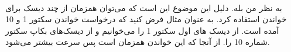 \\\noindent
به نظر من بله. دلیل این موضوع این است که می‌توان همزمان از چند دیسک برای خواندن استفاده کرد.
به عنوان مثال فرض کنید که درخواست خواندن سکتور 1 و 10 آمده است. از دیسک های اول سکتور 1 را می‌خوانیم و
از دیسک‌های بکاپ سکتور شماره 10 را.
از آنجا که این خواندن همزمان است پس سرعت بیشتر می‌شود.

